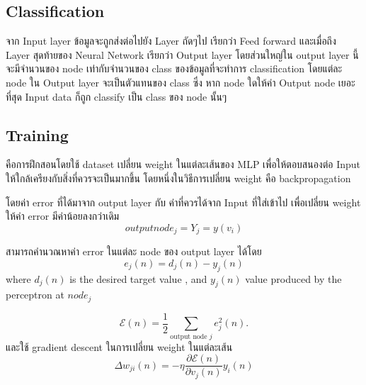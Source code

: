 \subsection{Classification}
จาก Input layer ข้อมูลจะถูกส่งต่อไปยัง Layer ถัดๆไป เรียกว่า Feed forward และเมื่อถึง
Layer สุดท้ายของ Neural Network เรียกว่า Output layer โดยส่วนใหญ่ใน output layer นี้จะมีจำนวนของ node เท่ากับจำนวนของ class ของข้อมูลที่จะทำการ classification
โดยแต่ละ node ใน Output layer จะเป็นตัวแทนของ class ซึ่ง หาก node ใดให้ค่า Output node เยอะที่สุด Input data ก็ถูก classify เป็น class ของ node นั้นๆ


\subsection{Training}
คือการฝึกสอนโดยใช้ dataset เปลี่ยน weight ในแต่ละเส้นของ MLP เพื่อให้ตอบสนองต่อ Input ให้ใกล้เครียงกับสิ่งที่ควรจะเป็นมากขึ้น
โดยหนึ่งในวิธีการเปลี่ยน weight คือ backpropagation


โดยค่า error ที่ได้มาจาก output layer กับ ค่าที่ควรได้จาก Input ที่ใส่เข้าไป เพื่อเปลี่ยน weight ให้ค่า error มีค่าน้อยลงกว่าเดิม
\begin{equation} output node_j =  Y_j =  y(v_i)  \end{equation}

สามารถคำนวณหาค่า error ในแต่ละ node ของ output layer ได้โดย
\begin{equation}  e_j(n)=d_j(n)-y_j(n)
\end{equation}
where $d_{j}(n)$  is the desired target value , and $y_{j}(n)$   value produced by the perceptron at $node_j$



\begin{equation}
  {\displaystyle {\mathcal {E}}(n)={\frac {1}{2}}\sum _{{\text{output node }}j}e_{j}^{2}(n)}.
\end{equation}
และใช้  gradient descent ในการเปลี่ยน weight ในแต่ละเส้น
\begin{equation}
  \Delta w_{ji} (n) = -\eta\frac{\partial\mathcal{E}(n)}{\partial v_j(n)} y_i(n)
\end{equation}





